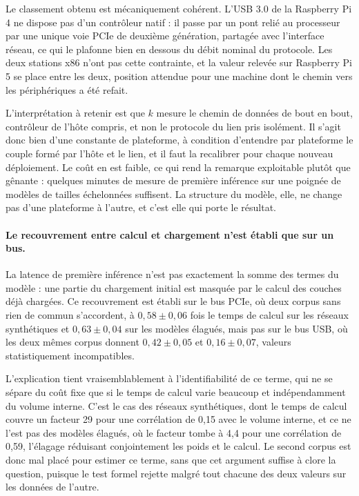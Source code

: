 \documentclass[11pt,a4paper]{report}
\begin{document}
Le classement obtenu est mécaniquement cohérent. L'USB 3.0 de la Raspberry Pi 4 ne dispose pas d'un contrôleur natif : il passe par un pont relié au processeur par une unique voie PCIe de deuxième génération, partagée avec l'interface réseau, ce qui le plafonne bien en dessous du débit nominal du protocole. Les deux stations x86 n'ont pas cette contrainte, et la valeur relevée sur Raspberry Pi 5 se place entre les deux, position attendue pour une machine dont le chemin vers les périphériques a été refait.

L'interprétation à retenir est que $k$ mesure le chemin de données de bout en bout, contrôleur de l'hôte compris, et non le protocole du lien pris isolément. Il s'agit donc bien d'une constante de plateforme, à condition d'entendre par plateforme le couple formé par l'hôte et le lien, et il faut la recalibrer pour chaque nouveau déploiement. Le coût en est faible, ce qui rend la remarque exploitable plutôt que gênante : quelques minutes de mesure de première inférence sur une poignée de modèles de tailles échelonnées suffisent. La structure du modèle, elle, ne change pas d'une plateforme à l'autre, et c'est elle qui porte le résultat.

\paragraph{Le recouvrement entre calcul et chargement n'est établi que sur un bus.} La latence de première inférence n'est pas exactement la somme des termes du modèle : une partie du chargement initial est masquée par le calcul des couches déjà chargées. Ce recouvrement est établi sur le bus PCIe, où deux corpus sans rien de commun s'accordent, à $0{,}58 \pm 0{,}06$ fois le temps de calcul sur les réseaux synthétiques et $0{,}63 \pm 0{,}04$ sur les modèles élagués, mais pas sur le bus USB, où les deux mêmes corpus donnent $0{,}42 \pm 0{,}05$ et $0{,}16 \pm 0{,}07$, valeurs statistiquement incompatibles.

L'explication tient vraisemblablement à l'identifiabilité de ce terme, qui ne se sépare du coût fixe que si le temps de calcul varie beaucoup et indépendamment du volume interne. C'est le cas des réseaux synthétiques, dont le temps de calcul couvre un facteur 29 pour une corrélation de 0,15 avec le volume interne, et ce ne l'est pas des modèles élagués, où le facteur tombe à 4,4 pour une corrélation de 0,59, l'élagage réduisant conjointement les poids et le calcul. Le second corpus est donc mal placé pour estimer ce terme, sans que cet argument suffise à clore la question, puisque le test formel rejette malgré tout chacune des deux valeurs sur les données de l'autre.
\end{document}
